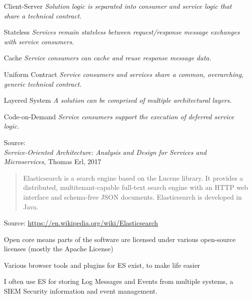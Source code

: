 \documentclass[Screen16to9,17pt]{foils}
\begin{document}
\begin{list2}
\item Client-Server \emph{Solution logic is separated into consumer and service logic that share a technical contract.}
\item Stateless \emph{Services remain stateless between request/response message exchanges with service consumers.}
\item Cache \emph{Service consumers can cache and reuse response message data.}
\item Uniform Contract \emph{Service consumers and services share a common, overarching, generic technical contract.}
\item  Layered System \emph{A solution can be comprised of multiple architectural layers.}
\item Code-on-Demand \emph{Service consumers support the execution of deferred service logic.}
\end{list2}
Source: {\footnotesize\\
\emph{Service‑Oriented Architecture: Analysis and Design for Services and Microservices}, Thomas Erl, 2017}







\begin{quote}
Elasticsearch is a search engine based on the Lucene library. It provides a distributed, multitenant-capable full-text search engine with an HTTP web interface and schema-free JSON documents. Elasticsearch is developed in Java.
\end{quote}

Source: \url{https://en.wikipedia.org/wiki/Elasticsearch}

\begin{list2}
\item Open core means parts of the software are licensed under various open-source licenses (mostly the Apache License)
\item Various browser tools and plugins for ES exist, to make life easier
\item I often use ES for storing Log Messages and Events from multiple systems, a SIEM Security information and event management.
\end{list2}




\begin{quote}

\end{quote}

\begin{list2}

\item
\end{list2}




\slidenext
\end{document}
